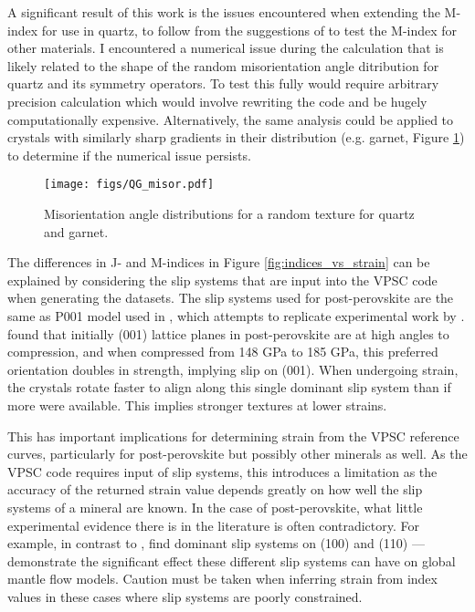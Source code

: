 \documentclass[a4paper,12pt,twoside]{report}
\numberwithin{equation}{chapter}
\begin{document}
A significant result of this work is the issues encountered when extending the M-index for use in quartz, to follow from the suggestions of \cite{Skemer} to test the M-index for other materials. I encountered a numerical issue during the calculation that is likely related to the shape of the random misorientation angle ditribution for quartz and its symmetry operators. To test this fully would require arbitrary precision calculation which would involve rewriting the code and be hugely computationally expensive. Alternatively, the same analysis could be applied to crystals with similarly sharp gradients in their distribution (e.g. garnet, Figure \ref{fig:garnet}) to determine if the numerical issue persists.

\begin{figure}[h!]
  \centering
    \texttt{[image: figs/QG\_misor.pdf]}
  \caption[Garnet misorientation angle distribution]{Misorientation angle distributions for a random texture for quartz and garnet.} 
  \label{fig:garnet}
\end{figure} 

The differences in J- and M-indices in Figure \ref{fig:indices_vs_strain} can be explained by considering the slip systems that are input into the VPSC code when generating the datasets. The slip systems used for post-perovskite are the same as P001 model used in \cite{Walker2012}, which attempts to replicate experimental work by \citep{Miyagi2010}. \cite{Miyagi2010} found that initially (001) lattice planes in post-perovskite are at high angles to compression, and when compressed from 148 GPa to 185 GPa, this preferred orientation doubles in strength, implying slip on (001). When undergoing strain, the crystals rotate faster to align along this single dominant slip system than if more were available. This implies stronger textures at lower strains.

This has important implications for determining strain from the VPSC reference curves, particularly for post-perovskite but possibly other minerals as well. As the VPSC code requires input of slip systems, this introduces a limitation as the accuracy of the returned strain value depends greatly on how well the slip systems of a mineral are known. In the case of post-perovskite, what little experimental evidence there is in the literature is often contradictory. For example, in contrast to \cite{Miyagi2010}, \cite{Merkel2007} find dominant slip systems on (100) and (110) --- \cite{Walker2012} demonstrate the significant effect these different slip systems can have on global mantle flow models. Caution must be taken when inferring strain from index values in these cases where slip systems are poorly constrained.
\end{document}
